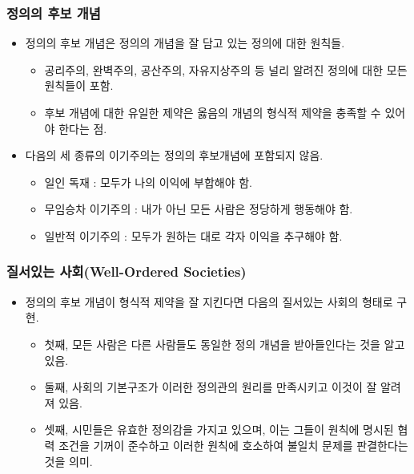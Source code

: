 \documentclass[aspectratio=169,xcolor=dvipsnames,handout]{beamer}
\begin{document}
\begin{frame}[<+->]
\frametitle{정의의 후보 개념}
    \begin{itemize}
        \item  정의의 후보 개념은 정의의 개념을 잘 담고 있는 정의에 대한 원칙들.
        \begin{itemize}
            \item 공리주의, 완벽주의, 공산주의, 자유지상주의 등 널리 알려진 정의에 대한 모든 원칙들이 포함.
            \item 후보 개념에 대한 유일한 제약은 옳음의 개념의 형식적 제약을 충족할 수 있어야 한다는 점.
        \end{itemize}
        \item  다음의 세 종류의 이기주의는 정의의 후보개념에 포함되지 않음.
        \begin{itemize}
            \item 일인 독재 : 모두가 나의 이익에 부합해야 함.
            \item 무임승차 이기주의 : 내가 아닌 모든 사람은 정당하게 행동해야 함.
            \item 일반적 이기주의 : 모두가 원하는 대로 각자 이익을 추구해야 함.
        \end{itemize}
    \end{itemize}
\end{frame}

\begin{frame}[<+->]
\frametitle{질서있는 사회(Well-Ordered Societies)}
    \begin{itemize}
        \item  정의의 후보 개념이 형식적 제약을 잘 지킨다면 다음의 질서있는 사회의 형태로 구현.
        \begin{itemize}
            \item 첫째, 모든 사람은 다른 사람들도 동일한 정의 개념을 받아들인다는 것을 알고 있음.
            \item 둘째, 사회의 기본구조가 이러한 정의관의 원리를 만족시키고 이것이 잘 알려져 있음.
            \item 셋째, 시민들은 유효한 정의감을 가지고 있으며, 이는 그들이 원칙에 명시된 협력 조건을 기꺼이 준수하고 이러한 원칙에 호소하여 불일치 문제를 판결한다는 것을 의미.
        \end{itemize}
    \end{itemize}
\end{frame}
\end{document}
